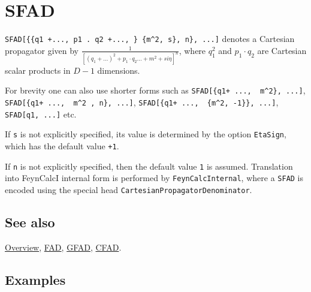 \documentclass[../FeynCalcManual.tex]{subfiles}
\begin{document}
\hypertarget{sfad}{
\section{SFAD}\label{sfad}}

\texttt{SFAD[\allowbreak{}\{\allowbreak{}\{\allowbreak{}q1 +...,\ \allowbreak{}p1 . q2 +...,\ \allowbreak{}\} \{\allowbreak{}m^2,\ \allowbreak{}s\},\ \allowbreak{}n\},\ \allowbreak{}...]}
denotes a Cartesian propagator given by
\(\frac{1}{[(q_1+\ldots)^2 + p_1 \cdot q_2 ... + m^2 + s i \eta]^n}\),
where \(q_1^2\) and \(p_1 \cdot q_2\) are Cartesian scalar products in
\(D-1\) dimensions.

For brevity one can also use shorter forms such as
\texttt{SFAD[\allowbreak{}\{\allowbreak{}q1+ ...,\ \allowbreak{} m^2\},\ \allowbreak{}...]},
\texttt{SFAD[\allowbreak{}\{\allowbreak{}q1+ ...,\ \allowbreak{} m^2 ,\ \allowbreak{}n\},\ \allowbreak{}...]},
\texttt{SFAD[\allowbreak{}\{\allowbreak{}q1+ ...,\ \allowbreak{} \{\allowbreak{}m^2,\ \allowbreak{}-1\}\},\ \allowbreak{}...]},
\texttt{SFAD[\allowbreak{}q1,\ \allowbreak{}...]} etc.

If \texttt{s} is not explicitly specified, its value is determined by
the option \texttt{EtaSign}, which has the default value \texttt{+1}.

If \texttt{n} is not explicitly specified, then the default value
\texttt{1} is assumed. Translation into FeynCalcI internal form is
performed by \texttt{FeynCalcInternal}, where a \texttt{SFAD} is encoded
using the special head \texttt{CartesianPropagatorDenominator}.

\subsection{See also}

\hyperlink{toc}{Overview}, \hyperlink{fad}{FAD}, \hyperlink{gfad}{GFAD},
\hyperlink{cfad}{CFAD}.

\subsection{Examples}

\begin{Shaded}
\begin{Highlighting}[]
\OperatorTok{[\{\{}\OperatorTok{,} \OperatorTok{\},} \SpecialCharTok{\^{}}\OperatorTok{\}]}
\end{Highlighting}
\end{Shaded}
\end{document}
